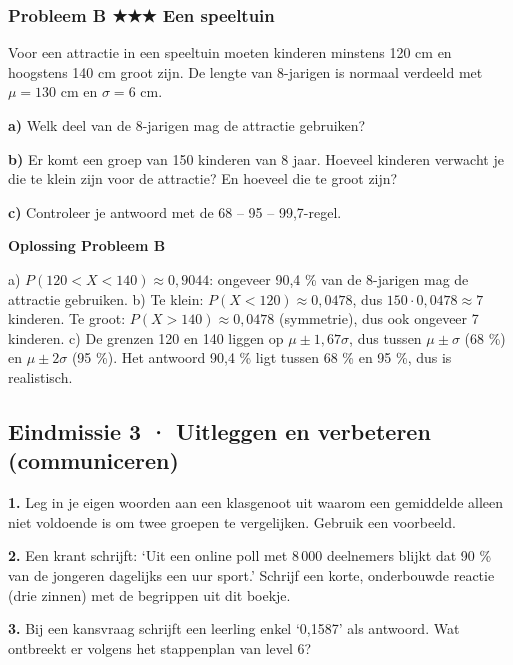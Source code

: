 \subsubsection*{Probleem B \quad ★★★ \quad Een speeltuin}

Voor een attractie in een speeltuin moeten kinderen minstens 120 cm en hoogstens 140 cm groot zijn. De lengte van 8-jarigen is normaal verdeeld met $\mu=130$ cm en $\sigma=6$ cm.

\textbf{a)} Welk deel van de 8-jarigen mag de attractie gebruiken? \lijn

\textbf{b)} Er komt een groep van 150 kinderen van 8 jaar. Hoeveel kinderen verwacht je die te klein zijn voor de attractie? En hoeveel die te groot zijn? \lijn

\textbf{c)} Controleer je antwoord met de 68 – 95 – 99,7-regel. \lijn

\begin{oplossing}
\textbf{Oplossing Probleem B}

a) $P(120<X<140)\approx 0{,}9044$: ongeveer 90,4 \% van de 8-jarigen mag de attractie gebruiken. b) Te klein: $P(X<120)\approx 0{,}0478$, dus $150\cdot 0{,}0478\approx 7$ kinderen. Te groot: $P(X>140)\approx 0{,}0478$ (symmetrie), dus ook ongeveer 7 kinderen. c) De grenzen 120 en 140 liggen op $\mu\pm 1{,}67\sigma$, dus tussen $\mu\pm\sigma$ (68 \%) en $\mu\pm 2\sigma$ (95 \%). Het antwoord 90,4 \% ligt tussen 68 \% en 95 \%, dus is realistisch.
\end{oplossing}

\subsection*{Eindmissie 3 · Uitleggen en verbeteren (communiceren)}

\textbf{1.} Leg in je eigen woorden aan een klasgenoot uit waarom een gemiddelde alleen niet voldoende is om twee groepen te vergelijken. Gebruik een voorbeeld. \lijn

\textbf{2.} Een krant schrijft: ‘Uit een online poll met 8\,000 deelnemers blijkt dat 90 \% van de jongeren dagelijks een uur sport.’ Schrijf een korte, onderbouwde reactie (drie zinnen) met de begrippen uit dit boekje. \lijn

\textbf{3.} Bij een kansvraag schrijft een leerling enkel ‘0,1587’ als antwoord. Wat ontbreekt er volgens het stappenplan van level 6? \lijn

